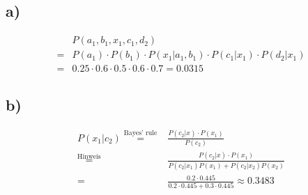 \documentclass[a4paper]{scrartcl}
\begin{document}
\subsection*{a)}
\begin{align*}
	&P(a_1, b_1, x_1, c_1, d_2) \\
	= &P(a_1) \cdot P(b_1) \cdot P(x_1|a_1, b_1) \cdot P(c_1|x_1) \cdot P(d_2|x_1)\\
	= &0.25 \cdot 0.6 \cdot 0.5 \cdot 0.6 \cdot 0.7 = 0.0315
\end{align*}

\subsection*{b)}
\begin{align*}
	P(x_1|c_2) \overset{\text{Bayes' rule}}{=} &\frac{P(c_2|x)\cdot P(x_1)}{P(c_2)}\\
	\overset{\text{Hinweis}}{=} &\frac{P(c_2|x)\cdot P(x_1)}{P(c_2|x_1)P(x_1) + P(c_2|x_2)P(x_2)}\\
	= &\frac{0.2\cdot 0.445}{0.2\cdot 0.445 + 0.3\cdot 0.445} \approx 0.3483
\end{align*}
\end{document}
